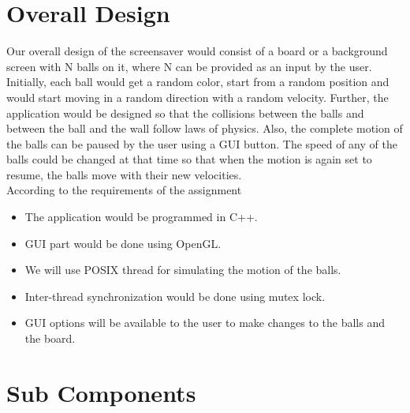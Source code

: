 \documentclass{article}
\begin{document}
\section{Overall Design}
Our overall design of the screensaver would consist of a board or a background screen with N balls on it, where N can be provided as an input by the user. Initially, each ball would get a random color, start from a random position and would start moving in a random direction with a random velocity. Further, the application would be designed so that the collisions between the balls and between the ball and the wall follow laws of physics. Also, the complete motion of the balls can be paused by the user using a GUI button. The speed of any of the balls could be changed at that time so that when the motion is again set to resume, the balls move with their new velocities.\\
According to the requirements of the assignment
\begin{itemize}
\item The application would be programmed in C++.
\item GUI part would be done using OpenGL.
\item We will use POSIX thread for simulating the motion of the balls.
\item Inter-thread synchronization would be done using mutex lock.
\item GUI options will be available to the user to make changes to the balls and the board.
\end{itemize} 
\section{Sub Components}
\end{document}
